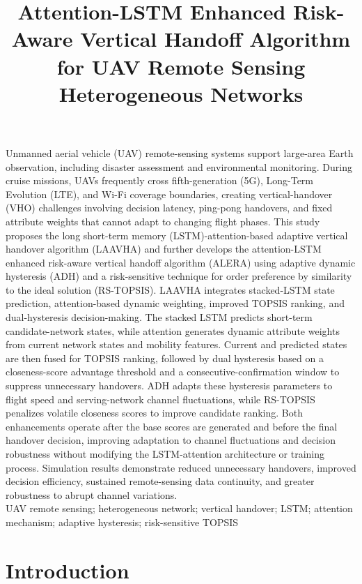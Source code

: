 \documentclass[10pt,a4paper]{article}
\title{Attention-LSTM Enhanced Risk-Aware Vertical Handoff Algorithm for UAV Remote Sensing Heterogeneous Networks}
\date{}
\begin{document}
\pagestyle{plain}
\fontsize{10.5pt}{15.75pt}\selectfont
\maketitle
\thispagestyle{plain}

Unmanned aerial vehicle (UAV) remote-sensing systems support large-area Earth observation, including disaster assessment and environmental monitoring. During cruise missions, UAVs frequently cross fifth-generation (5G), Long-Term Evolution (LTE), and Wi-Fi coverage boundaries, creating vertical-handover (VHO) challenges involving decision latency, ping-pong handovers, and fixed attribute weights that cannot adapt to changing flight phases. This study proposes the long short-term memory (LSTM)-attention-based adaptive vertical handover algorithm (LAAVHA) and further develops the attention-LSTM enhanced risk-aware vertical handoff algorithm (ALERA) using adaptive dynamic hysteresis (ADH) and a risk-sensitive technique for order preference by similarity to the ideal solution (RS-TOPSIS). LAAVHA integrates stacked-LSTM state prediction, attention-based dynamic weighting, improved TOPSIS ranking, and dual-hysteresis decision-making. The stacked LSTM predicts short-term candidate-network states, while attention generates dynamic attribute weights from current network states and mobility features. Current and predicted states are then fused for TOPSIS ranking, followed by dual hysteresis based on a closeness-score advantage threshold and a consecutive-confirmation window to suppress unnecessary handovers. ADH adapts these hysteresis parameters to flight speed and serving-network channel fluctuations, while RS-TOPSIS penalizes volatile closeness scores to improve candidate ranking. Both enhancements operate after the base scores are generated and before the final handover decision, improving adaptation to channel fluctuations and decision robustness without modifying the LSTM-attention architecture or training process. Simulation results demonstrate reduced unnecessary handovers, improved decision efficiency, sustained remote-sensing data continuity, and greater robustness to abrupt channel variations.\\[2mm]
 UAV remote sensing; heterogeneous network; vertical handover; LSTM; attention mechanism; adaptive hysteresis; risk-sensitive TOPSIS

\setcounter{section}{-1}
\section{Introduction}
\end{document}
